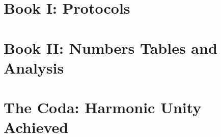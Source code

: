 \documentclass[a4paper,12pt]{book}
\begin{document}
\chapter{Book I: Protocols}





\chapter{Book II: Numbers Tables and Analysis}




\chapter{The Coda: Harmonic Unity Achieved}

\end{document}
